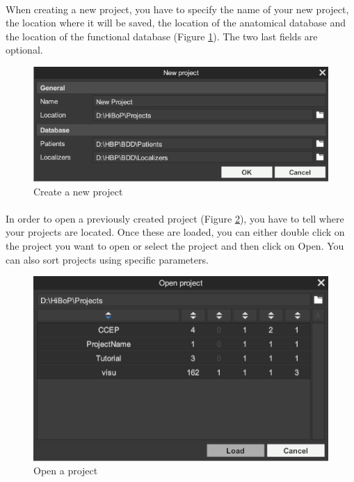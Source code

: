\documentclass[a4paper]{article}
\begin{document}
\paragraph{} When creating a new project, you have to specify the name of your new project, the location where it will be saved, the location of the anatomical database and the location of the functional database (Figure \ref{newProjectUI}). The two last fields are optional.
\begin{figure}[H]
\begin{center}
\includegraphics[scale=0.5]{NewProject.png}
\end{center}
\caption{\label{newProjectUI}Create a new project}
\end{figure}
\paragraph{} In order to open a previously created project (Figure \ref{openProjectUI}), you have to tell where your projects are located. Once these are loaded, you can either double click on the project you want to open or select the project and then click on Open. You can also sort projects using specific parameters.
\begin{figure}[H]
\begin{center}
\includegraphics[scale=0.5]{OpenProject.png}
\end{center}
\caption{\label{openProjectUI}Open a project}
\end{figure}
\end{document}
